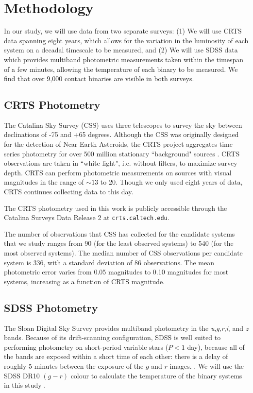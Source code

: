 \documentclass[11pt, oneside]{article}   	%
\begin{document}
\section{Methodology}

In our study, we will use data from two separate surveys: (1) We will use CRTS data spanning eight years, which allows for the variation in the luminosity of each system on a decadal timescale to be measured, and (2) We will use SDSS data which provides multiband photometric measurements taken within the timespan of a few minutes, allowing the temperature of each binary to be measured. We find that over 9,000 contact binaries are visible in both surveys. 

\subsection{CRTS Photometry}

The Catalina Sky Survey (CSS) uses three telescopes to survey the sky between declinations of -75 and +65 degrees. Although the CSS was originally designed for the detection of Near Earth Asteroids, the CRTS project aggregates time-series photometry for over 500 million stationary ``background" sources \citep{drake2009first, mahabal2011discovery, djorgovski2012catalina}. CRTS observations are taken in ``white light", i.e. without filters, to maximize survey depth. CRTS can perform photometric measurements on sources with visual magnitudes in the range of $\sim13$ to $20$. Though we only used eight years of data, CRTS continues collecting data to this day. 

The CRTS photometry used in this work is publicly accessible through the Catalina Surveys Data Release 2 at \texttt{crts.caltech.edu}. 

The number of observations that CSS has collected for the candidate systems that we study ranges from 90 (for the least observed systems) to 540 (for the most observed systems). The median number of CSS observations per candidate system is $336$, with a standard deviation of $86$ observations.  The mean photometric error varies from 0.05 magnitudes to 0.10 magnitudes for most systems, increasing as a function of CRTS magnitude. 

\subsection{SDSS Photometry}

The Sloan Digital Sky Survey provides multiband photometry in the \emph{u},\emph{g},\emph{r},\emph{i}, and \emph{z} bands. Because of its drift-scanning configuration, SDSS is well suited to performing photometry on short-period variable stars ($P < 1$ day), because all of the bands are exposed within a short time of each other: there is a delay of roughly 5 minutes between the exposure of the $g$ and $r$ images. \citep{york2000sloan}. We will use the SDSS DR10 $(g - r)$ colour to calculate the temperature of the binary systems in this study \citep{ahn2014tenth}. 
\end{document}
